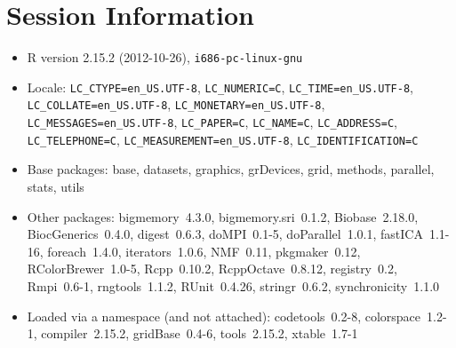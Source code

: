 \documentclass[10pt]{article}
\begin{document}
\section*{Session Information}
\begin{itemize}\raggedright
  \item R version 2.15.2 (2012-10-26), \verb|i686-pc-linux-gnu|
  \item Locale: \verb|LC_CTYPE=en_US.UTF-8|, \verb|LC_NUMERIC=C|, \verb|LC_TIME=en_US.UTF-8|, \verb|LC_COLLATE=en_US.UTF-8|, \verb|LC_MONETARY=en_US.UTF-8|, \verb|LC_MESSAGES=en_US.UTF-8|, \verb|LC_PAPER=C|, \verb|LC_NAME=C|, \verb|LC_ADDRESS=C|, \verb|LC_TELEPHONE=C|, \verb|LC_MEASUREMENT=en_US.UTF-8|, \verb|LC_IDENTIFICATION=C|
  \item Base packages: base, datasets, graphics, grDevices, grid,
    methods, parallel, stats, utils
  \item Other packages: bigmemory~4.3.0, bigmemory.sri~0.1.2,
    Biobase~2.18.0, BiocGenerics~0.4.0, digest~0.6.3, doMPI~0.1-5,
    doParallel~1.0.1, fastICA~1.1-16, foreach~1.4.0, iterators~1.0.6,
    NMF~0.11, pkgmaker~0.12, RColorBrewer~1.0-5, Rcpp~0.10.2,
    RcppOctave~0.8.12, registry~0.2, Rmpi~0.6-1, rngtools~1.1.2,
    RUnit~0.4.26, stringr~0.6.2, synchronicity~1.1.0
  \item Loaded via a namespace (and not attached): codetools~0.2-8,
    colorspace~1.2-1, compiler~2.15.2, gridBase~0.4-6, tools~2.15.2,
    xtable~1.7-1
\end{itemize}
\end{document}
